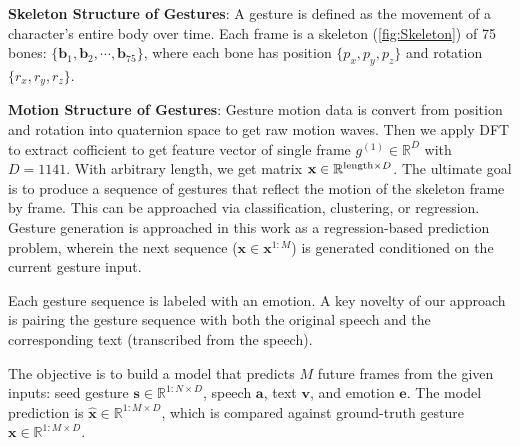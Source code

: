 \textbf{Skeleton Structure of Gestures}: A gesture is defined as the movement of a character's entire body over time.
Each frame is a skeleton (\autoref{fig:Skeleton}) of 75 bones: $\{ \mathbf{b}_{1}, \mathbf{b}_{2}, \cdots , \mathbf{b}_{75} \}$, where each bone has position $\{ p_{x}, p_{y}, p_{z} \}$ and rotation $\{ r_{x}, r_{y}, r_{z} \}$.



\textbf{Motion Structure of Gestures}: Gesture motion data is convert from position and rotation into quaternion space to get raw motion waves. Then we apply DFT to extract cofficient \citep{suwajanakorn2017synthesizing} to get feature vector of single frame $g^{(1)} \in \mathbb{R}^{D}$ with $D = 1141$. With arbitrary length, we get matrix $\mathbf{x} \in \mathbb{R}^{\text{length} \times D}$. The ultimate goal is to produce a sequence of gestures that reflect the motion of the skeleton frame by frame. This can be approached via classification, clustering, or regression. Gesture generation is approached in this work as a regression-based prediction problem, wherein the next sequence ($\mathbf{x} \in \mathbf{x}^{1:M}$) is generated conditioned on the current gesture input.

Each gesture sequence is labeled with an emotion. A key novelty of our approach is pairing the gesture sequence with both the original speech and the corresponding text (transcribed from the speech).

The objective is to build a model that predicts $M$ future frames from the given inputs: seed gesture $\mathbf{s} \in \mathbb{R}^{1:N \times D}$, speech $\mathbf{a}$, text $\mathbf{v}$, and emotion $\mathbf{e}$. The model prediction is $\hat{\mathbf{x}} \in \mathbb{R}^{1:M \times D}$, which is compared against ground-truth gesture $\mathbf{x} \in \mathbb{R}^{1:M \times D}$.


